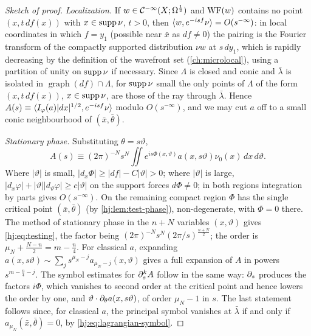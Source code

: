 \begin{proof}[Sketch of proof]
  \emph{Localization.}  If $w\in\mathcal{C}^{-\infty}(X;\Omega^{\frac12})$ and $\operatorname{WF}(w)$ contains no point
  $(x,t\,df(x))$ with $x\in\operatorname{supp}\nu$, $t>0$, then
  $\langle w, e^{-isf}\nu\rangle=O(s^{-\infty})$: in local coordinates in which $f=y_1$
  (possible near $\bar x$ as $df\neq0$) the pairing is the Fourier transform of
  the compactly supported distribution $\nu w$ at $s\,dy_1$, which is rapidly
  decreasing by the definition of the wavefront set (\cref{ch:microlocal}),
  using a partition of unity on $\operatorname{supp}\nu$ if necessary.  Since $\Lambda$ is
  closed and conic and $\bar\lambda$ is isolated in
  $\operatorname{graph}(df)\cap\Lambda$, for $\operatorname{supp}\nu$ small the only points of
  $\Lambda$ of the form $(x,t\,df(x))$, $x\in\operatorname{supp}\nu$, are those of the ray
  through $\bar\lambda$.  Hence $A(s)\equiv\langle I_\varphi(a)|dx|^{1/2}, e^{-isf}\nu\rangle$
  modulo $O(s^{-\infty})$, and we may cut $a$ off to a small conic neighbourhood
  of $(\bar x,\bar\theta)$.

  \emph{Stationary phase.}  Substituting $\theta=s\vartheta$,
  \begin{equation*}
    A(s)\equiv(2\pi)^{-N}s^N\iint e^{is\Phi(x,\vartheta)}a(x,s\vartheta)\nu_0(x)
    \,dx\,d\vartheta .
  \end{equation*}
  Where $|\vartheta|$ is small, $|d_x\Phi|\ge|df|-C|\vartheta|>0$; where
  $|\vartheta|$ is large, $|d_x\varphi|+|\vartheta||d_\vartheta\varphi|\ge
  c|\vartheta|$ on the support forces $d\Phi\neq0$; in both regions integration
  by parts gives $O(s^{-\infty})$.  On the remaining compact region $\Phi$ has
  the single critical point $(\bar x,\bar\theta)$ (by \cref{hj:lem:test-phase}),
  non-degenerate, with $\Phi=0$ there.  The method of stationary phase in the
  $n+N$ variables $(x,\vartheta)$ \cite[Theorem~7.7.5]{Hormander-I} gives
  \eqref{hj:eq:testing}, the factor being
  $(2\pi)^{-N}s^N(2\pi/s)^{\frac{n+N}2}$; the order is
  $\mu_N+\frac{N-n}2=m-\frac n4$.  For classical $a$, expanding
  $a(x,s\vartheta)\sim\sum_js^{\mu_N-j}a_{\mu_N-j}(x,\vartheta)$ gives a full
  expansion of $A$ in powers $s^{m-\frac n4-j}$.  The symbol estimates for
  $\partial_s^kA$ follow in the same way: $\partial_s$ produces the factors $i\Phi$, which
  vanishes to second order at the critical point and hence lowers the order by
  one, and $\vartheta\cdot\partial_\theta a(x,s\vartheta)$, of order $\mu_N-1$ in $s$.
  The last statement follows since, for classical $a$, the principal symbol
  vanishes at $\bar\lambda$ if and only if $a_{\mu_N}(\bar x,\bar\theta)=0$, by
  \eqref{hj:eq:lagrangian-symbol}.
\end{proof}

